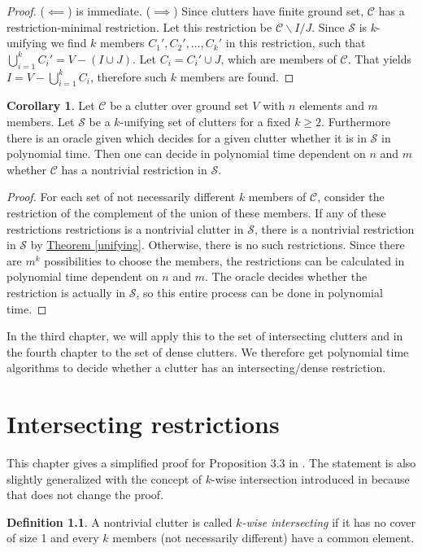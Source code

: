 \documentclass[a4paper, 12pt, twoside=false]{scrbook}
\theoremstyle{definition}
\newtheorem*{definition}{Definition}
\newtheorem{corollary}[theorem]{Corollary}
\begin{document}
   \begin{proof}
       ($\impliedby$) is immediate.
       ($\implies$) Since clutters have finite ground set, $\mathcal{C}$ has a restriction-minimal restriction.
       Let this restriction be $\mathcal{C}\backslash I / J$.
       Since $\mathcal{S}$ is $k$-unifying we find $k$ members $C_1', C_2', \ldots, C_k'$ in this restriction, such that $\bigcup_{i=1}^k C_i' = V - (I \cup J)$.
       Let $C_i = C_i' \cup J$, which are members of $\mathcal{C}$.
       That yields $I=V-\bigcup_{i=1}^k C_i$, therefore such $k$ members are found.
   \end{proof}
   \begin{corollary}
       Let $\mathcal{C}$ be a clutter over ground set $V$ with $n$ elements and $m$ members.
       Let $\mathcal{S}$ be a $k$-unifying set of clutters for a fixed $k\geq 2$.
       Furthermore there is an oracle given which decides for a given clutter whether it is in $\mathcal{S}$ in polynomial time.
       Then one can decide in polynomial time dependent on $n$ and $m$ whether $\mathcal{C}$ has a nontrivial restriction in $\mathcal{S}$.
   \end{corollary}

   \begin{proof}
       For each set of not necessarily different $k$ members of $\mathcal{C}$, consider the restriction of the complement of the union of these members.
       If any of these restrictions restrictions is a nontrivial clutter in $\mathcal{S}$, there is a nontrivial restriction in $\mathcal{S}$ by \hyperref[unifying]{Theorem \ref*{unifying}}.
       Otherwise, there is no such restrictions.
       Since there are $m^k$ possibilities to choose the members, the restrictions can be calculated in polynomial time dependent on $n$ and $m$. The oracle decides whether the restriction is actually in $\mathcal{S}$, so this entire process can be done in polynomial time.
   \end{proof}

   In the third chapter, we will apply this to the set of intersecting clutters and in the fourth chapter to the set of dense clutters.
   We therefore get polynomial time algorithms to decide whether a clutter has an intersecting/dense restriction.

   \chapter{Intersecting restrictions}
   This chapter gives a simplified proof for Proposition 3.3 in \cite{restrictions}.
   The statement is also slightly generalized with the concept of $k$-wise intersection introduced in \cite{k-wise} because that does not change the proof.
   \begin{definition}
       A nontrivial clutter is called \emph{$k$-wise intersecting} if it has no cover of size 1 and every $k$ members (not necessarily different) have a common element.
   \end{definition}
\end{document}
